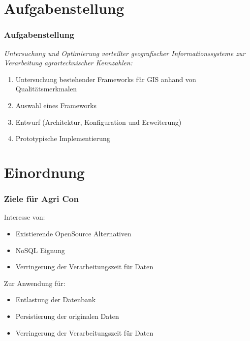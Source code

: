 \documentclass{beamer}
\begin{document}
\section{Aufgabenstellung}
\begin{frame}\frametitle{Aufgabenstellung}
\textit{Untersuchung und Optimierung verteilter geografischer Informationssysteme zur Verarbeitung agrartechnischer Kennzahlen:}\\


\begin{enumerate} %
\item Untersuchung bestehender Frameworks für GIS anhand von Qualitätsmerkmalen
\item Auswahl eines Frameworks
\item Entwurf (Architektur, Konfiguration und Erweiterung)
\item Prototypische Implementierung %
\end{enumerate}
\end{frame}

\section{Einordnung}
\begin{frame}\frametitle{Ziele für Agri Con} 
\begin{block}{Interesse von:}
\begin{itemize}
\item Existierende OpenSource Alternativen
\item NoSQL Eignung
\item Verringerung der Verarbeitungszeit für Daten
\end{itemize}
\end{block}

\begin{block}{Zur Anwendung für:}
\begin{itemize}
\item Entlastung der Datenbank
\item Persistierung der originalen Daten
\item Verringerung der Verarbeitungszeit für Daten
\end{itemize}
\end{block}
\end{frame}
\end{document}
